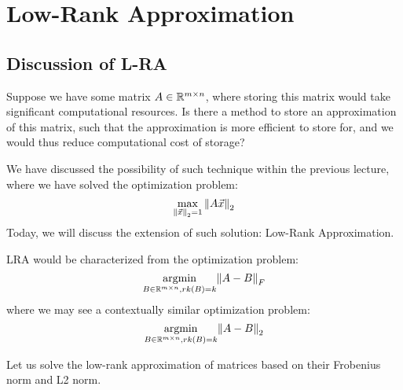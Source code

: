 \chapter{Low-Rank Approximation}

\section{Discussion of L-RA}
Suppose we have some matrix $A \in \mathbb{R}^{m \times n}$, where storing this matrix would take significant computational resources.
Is there a method to store an approximation of this matrix, such that the approximation is more efficient to store for, and we would thus reduce computational cost of storage?
\par
We have discussed the possibility of such technique within the previous lecture, where we have solved the optimization problem:
\[\max_{{\| \vec{x} \|}_{2}^{} = 1} {\| A \vec{x} \|}_{2}^{}\]
Today, we will discuss the extension of such solution: Low-Rank Approximation.
\par
LRA would be characterized from the optimization problem:
\[
    \underset{B \in \mathbb{R}^{m \times n}, rk(B) = k}{\text{argmin}} {\| A - B \|}_{F}^{}
\]
where we may see a contextually similar optimization problem:
\[
    \underset{B \in \mathbb{R}^{m \times n}, rk(B) = k}{\text{argmin}} {\| A - B \|}_{2}^{}
\]
\par
Let us solve the low-rank approximation of matrices based on their Frobenius norm and L2 norm.
